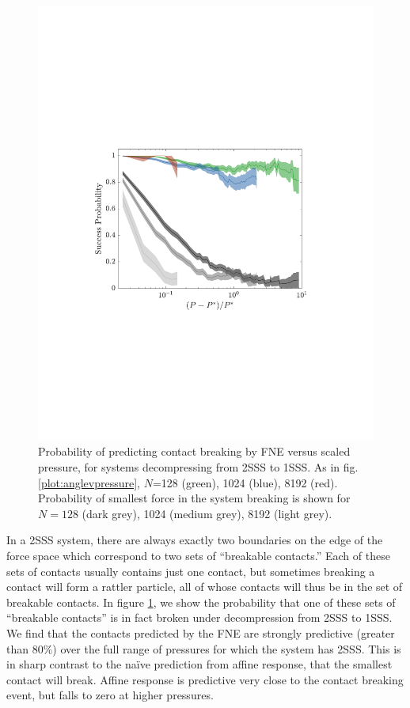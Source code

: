 \begin{figure}[t!]
\includegraphics[width=\columnwidth, trim=104 240 123 260, clip]{contactBreakingPaper/pcorrect.pdf}
\caption{Probability of predicting contact breaking by FNE versus scaled pressure, for systems decompressing from 2SSS to 1SSS. As in fig. \ref{plot:anglevpressure}, $N$=128 (green), 1024 (blue), 8192 (red). Probability of smallest force in the system breaking is shown for $N=128$ (dark grey), 1024 (medium grey), 8192 (light grey). %
}
\label{plot:predictionProb}
\end{figure}

In a 2SSS system, there are always exactly two boundaries on the edge of the force space which correspond to two sets of ``breakable contacts.'' Each of these sets of contacts usually contains just one contact, but sometimes breaking a contact will form a rattler particle, all of whose contacts will thus be in the set of breakable contacts. In figure \ref{plot:predictionProb}, we show the probability that one of these sets of ``breakable contacts'' is in fact broken under decompression from 2SSS to 1SSS. We find that the contacts predicted by the FNE are strongly predictive (greater than $80\%$) over the full range of pressures for which the system has 2SSS. This is in sharp contrast to the na\"ive prediction from affine response, that the smallest contact will break. Affine response is predictive very close to the contact breaking event, but falls to zero at higher pressures.




